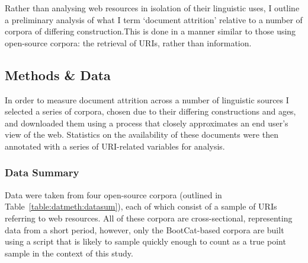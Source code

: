 Rather than analysing web resources in isolation of their linguistic uses, I outline a preliminary analysis of what I term `document attrition' relative to a number of corpora of differing construction.This is done in a manner similar to those using open-source corpora: the retrieval of URIs, rather than information.













\subsection{Methods \& Data}


In order to measure document attrition across a number of linguistic sources I selected a series of corpora, chosen due to their differing constructions and ages, and downloaded them using a process that closely approximates an end user's view of the web.  Statistics on the availability of these documents were then annotated with a series of URI-related variables for analysis.




\subsubsection{Data Summary}
Data were taken from four open-source corpora (outlined in Table~\ref{table:datmeth:datasum}), each of which consist of a sample of URIs referring to web resources.  All of these corpora are cross-sectional, representing data from a short period, however, only the BootCat-based corpora are built using a script that is likely to sample quickly enough to count as a true point sample in the context of this study.

